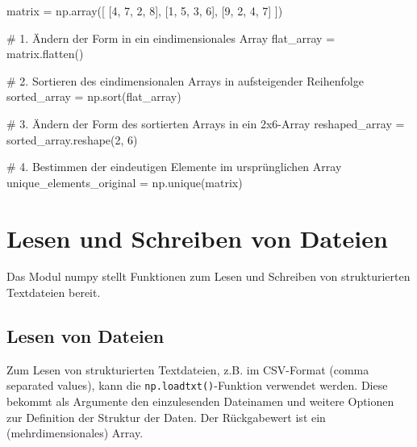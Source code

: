 \documentclass[
  letterpaper,
  DIV=11,
  numbers=noendperiod]{scrreprt}
\newenvironment{Shaded}{\begin{snugshade}}{\end{snugshade}}
\newcommand{\CommentTok}[1]{\textcolor[rgb]{0.37,0.37,0.37}{#1}}
\newcommand{\DecValTok}[1]{\textcolor[rgb]{0.68,0.00,0.00}{#1}}
\newcommand{\NormalTok}[1]{\textcolor[rgb]{0.00,0.23,0.31}{#1}}
\newcommand{\OperatorTok}[1]{\textcolor[rgb]{0.37,0.37,0.37}{#1}}
\begin{document}
\begin{tcolorbox}
\begin{tcolorbox}
\begin{Shaded}
\begin{Highlighting}[]
\NormalTok{matrix }\OperatorTok{=}\NormalTok{ np.array([}
\NormalTok{    [}\DecValTok{4}\NormalTok{, }\DecValTok{7}\NormalTok{, }\DecValTok{2}\NormalTok{, }\DecValTok{8}\NormalTok{],}
\NormalTok{    [}\DecValTok{1}\NormalTok{, }\DecValTok{5}\NormalTok{, }\DecValTok{3}\NormalTok{, }\DecValTok{6}\NormalTok{],}
\NormalTok{    [}\DecValTok{9}\NormalTok{, }\DecValTok{2}\NormalTok{, }\DecValTok{4}\NormalTok{, }\DecValTok{7}\NormalTok{]}
\NormalTok{])}

\CommentTok{\# 1. Ändern der Form in ein eindimensionales Array}
\NormalTok{flat\_array }\OperatorTok{=}\NormalTok{ matrix.flatten()}

\CommentTok{\# 2. Sortieren des eindimensionalen Arrays in aufsteigender Reihenfolge}
\NormalTok{sorted\_array }\OperatorTok{=}\NormalTok{ np.sort(flat\_array)}

\CommentTok{\# 3. Ändern der Form des sortierten Arrays in ein 2x6{-}Array}
\NormalTok{reshaped\_array }\OperatorTok{=}\NormalTok{ sorted\_array.reshape(}\DecValTok{2}\NormalTok{, }\DecValTok{6}\NormalTok{)}

\CommentTok{\# 4. Bestimmen der eindeutigen Elemente im ursprünglichen Array}
\NormalTok{unique\_elements\_original }\OperatorTok{=}\NormalTok{ np.unique(matrix)}
\end{Highlighting}
\end{Shaded}

\end{tcolorbox}

\end{tcolorbox}

\chapter{Lesen und Schreiben von
Dateien}\label{lesen-und-schreiben-von-dateien}

Das Modul numpy stellt Funktionen zum Lesen und Schreiben von
strukturierten Textdateien bereit.

\section{Lesen von Dateien}\label{lesen-von-dateien}

Zum Lesen von strukturierten Textdateien, z.B. im CSV-Format (comma
separated values), kann die \texttt{np.loadtxt()}-Funktion verwendet
werden. Diese bekommt als Argumente den einzulesenden Dateinamen und
weitere Optionen zur Definition der Struktur der Daten. Der Rückgabewert
ist ein (mehrdimensionales) Array.
\end{document}
